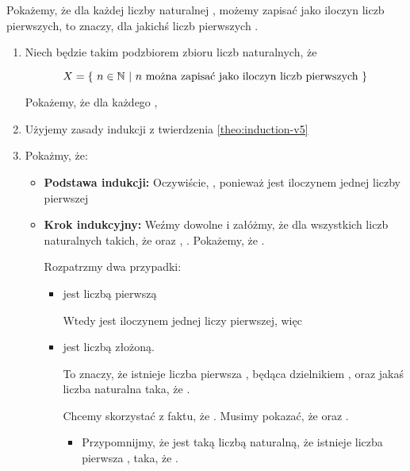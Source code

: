 \begin{example}
Pokażemy, że dla każdej liczby naturalnej ,  możemy zapisać jako iloczyn liczb pierwszych, to znaczy,  dla jakichś liczb pierwszych . 

\begin{enumerate}
    \item Niech  będzie takim podzbiorem zbioru liczb naturalnych, że
    
     \[
        X = \{\ n \in \mathbb{N}\ |\ n \text{ można zapisać jako iloczyn liczb pierwszych}\ \}
    \]
    
    Pokażemy, że dla każdego  , 
    \item Użyjemy zasady indukcji z twierdzenia \ref{theo:induction-v5}
    
    \item Pokażmy, że:
    \begin{itemize}
        \item \textbf{Podstawa indukcji:}
        Oczywiście, , ponieważ  jest iloczynem jednej liczby pierwszej
        
        \item \textbf{Krok indukcyjny:}
        Weźmy dowolne  i załóżmy, że dla wszystkich liczb naturalnych  takich, że  oraz , . Pokażemy, że .
        
        Rozpatrzmy dwa przypadki:
        \begin{itemize}
            \item {} jest liczbą pierwszą
            
            Wtedy  jest iloczynem jednej liczy pierwszej, więc 
            
            \item {} jest liczbą złożoną. 
            
            To znaczy, że istnieje liczba pierwsza , będąca dzielnikiem , oraz jakaś liczba naturalna  taka, że . 
            
            Chcemy skorzystać z faktu, że . Musimy pokazać, że  oraz .
            
            \begin{itemize}
                \item {}
                
                Przypomnijmy, że  jest taką liczbą naturalną, że istnieje liczba pierwsza , taka, że .
                

\end{itemize}
\end{itemize}
\end{itemize}
\end{enumerate}
\end{example}
